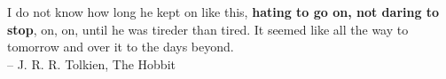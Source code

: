 \begin{starting_phrase}
	I do not know how long he kept on like this, \textbf{hating to go on, not daring to stop}, on, on, until he was tireder than tired. It seemed like all the way to tomorrow and over it to the days beyond.\\
	\flushright -- J. R. R. Tolkien, The Hobbit
\end{starting_phrase}